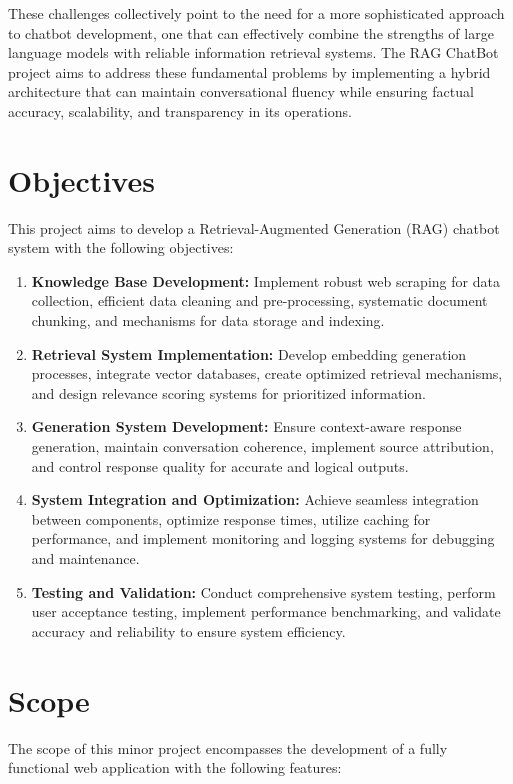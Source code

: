 \documentclass[12pt,a4paper]{report}
\begin{document}
These challenges collectively point to the need for a more sophisticated approach to chatbot development, one that can effectively combine the strengths of large language models with reliable information retrieval systems. The RAG ChatBot project aims to address these fundamental problems by implementing a hybrid architecture that can maintain conversational fluency while ensuring factual accuracy, scalability, and transparency in its operations.

\section{Objectives}

This project aims to develop a Retrieval-Augmented Generation (RAG) chatbot system with the following objectives:  

\begin{enumerate}
    \item \textbf{Knowledge Base Development:} Implement robust web scraping for data collection, efficient data cleaning and pre-processing, systematic document chunking, and mechanisms for data storage and indexing.
    \item \textbf{Retrieval System Implementation:} Develop embedding generation processes, integrate vector databases, create optimized retrieval mechanisms, and design relevance scoring systems for prioritized information.
    \item \textbf{Generation System Development:} Ensure context-aware response generation, maintain conversation coherence, implement source attribution, and control response quality for accurate and logical outputs.
    \item \textbf{System Integration and Optimization:} Achieve seamless integration between components, optimize response times, utilize caching for performance, and implement monitoring and logging systems for debugging and maintenance.
    \item \textbf{Testing and Validation:} Conduct comprehensive system testing, perform user acceptance testing, implement performance benchmarking, and validate accuracy and reliability to ensure system efficiency.
\end{enumerate}

\section{Scope}

The scope of this minor project encompasses the development of a fully functional web application with the following features:
\end{document}
